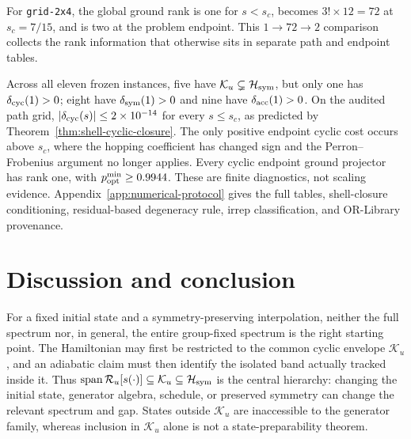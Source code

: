 For \texttt{grid-2x4}, the global ground rank is one for $s<s_c$, becomes
$3!\times12=72$ at $s_c=7/15$, and is two at the problem endpoint.  This
$1\to72\to2$ comparison collects the rank information that otherwise sits
in separate path and endpoint tables.

Across all eleven frozen instances, five have
$\mathcal K_u\subsetneq\mathcal H_{\rm sym}$, but only one has
$\delta_{\rm cyc}(1)>0$; eight have $\delta_{\rm sym}(1)>0$ and nine have
$\delta_{\rm acc}(1)>0$.  On the audited path grid,
$|\delta_{\rm cyc}(s)|\leq2\times10^{-14}$ for every $s\leq s_c$, as
predicted by Theorem~\ref{thm:shell-cyclic-closure}.  The only positive
endpoint cyclic cost occurs above $s_c$, where the hopping coefficient has
changed sign and the Perron--Frobenius argument no longer applies.  Every
cyclic endpoint ground projector has rank one, with
$p_{\rm opt}^{\min}\geq0.9944$.  These are finite diagnostics, not scaling
evidence.  Appendix~\ref{app:numerical-protocol} gives the full tables,
shell-closure
conditioning, residual-based degeneracy rule, irrep classification, and
OR-Library provenance.

\section{Discussion and conclusion}
\label{sec:rewrite-conclusion}

For a fixed initial state and a symmetry-preserving interpolation, neither
the full spectrum nor, in general, the entire group-fixed spectrum is the
right starting point.  The Hamiltonian may first be restricted to the common
cyclic envelope $\mathcal K_u$, and an adiabatic claim must then identify the
isolated band actually tracked inside it.  Thus
$\operatorname{span}\mathcal R_u[s(\cdot)]\subseteq\mathcal K_u
\subseteq\mathcal H_{\rm sym}$ is the central hierarchy: changing the
initial state, generator algebra, schedule, or preserved symmetry can change
the relevant spectrum and gap.  States outside $\mathcal K_u$ are
inaccessible to the generator family, whereas inclusion in $\mathcal K_u$
alone is not a state-preparability theorem.

